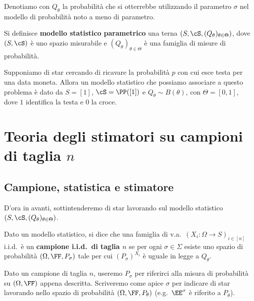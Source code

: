 \begin{multicols*}{2}
\begin{notation}
    Denotiamo con $Q_\theta$ la probabilità che si otterrebbe utilizzando il parametro $\sigma$
    nel modello di probabilità noto a meno di parametro.
\end{notation}

\begin{definition}
    Si definisce \textbf{modello statistico parametrico} una terna $(S, \cS, (Q_\theta)_{\theta \in \Theta})$,
    dove $(S, \cS)$ è uno spazio misurabile e $(Q_\theta)_{\theta \in \Theta}$ è una famiglia di
    misure di probabilità.
\end{definition}

\begin{example}
    Supponiamo di star cercando di ricavare la probabilità $p$ con cui esce testa per una data moneta. Allora
    un modello statistico che possiamo associare a questo problema è dato da $S = [1]$, $\cS = \PP([1])$ e
    $Q_\theta \sim B(\theta)$, con $\Theta = [0, 1]$, dove $1$ identifica la testa e $0$ la croce.
\end{example}

\section{Teoria degli stimatori su campioni di taglia \texorpdfstring{$n$}{n}}

\subsection{Campione, statistica e stimatore}

D'ora in avanti, sottintenderemo di star lavorando sul modello
statistico $(S, \cS, (Q_\theta)_{\theta \in \Theta})$.

\begin{definition}
    Dato un modello statistico, si dice
    che una famiglia di v.a.~$(X_i : \Omega \to S)_{i \in [n]}$ i.i.d.~è un \textbf{campione i.i.d.~di taglia $n$}
    se per ogni $\sigma \in \Sigma$ esiste uno spazio di probabilità $(\Omega, \FF, P_\sigma)$ tale per cui
    $(P_\sigma)^{X_i}$ è uguale in legge a $Q_\theta$.
\end{definition}

Dato un campione di taglia $n$, useremo $P_\sigma$ per riferirci alla misura di probabilità
su $(\Omega, \FF)$ appena descritta. Scriveremo
come apice $\sigma$ per indicare di star lavorando nello spazio
di probabilità $(\Omega, \FF, P_\theta)$ (e.g.~$\EE^\sigma$ è riferito
a $P_\theta$).


\end{multicols*}
